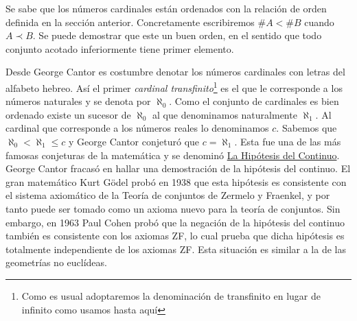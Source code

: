  Se sabe que los números cardinales están ordenados con la relación  de orden  definida en la sección anterior.  Concretamente escribiremos   $\#A< \#B$ cuando $A\prec B$. Se puede demostrar que este un buen orden, en el sentido que todo conjunto acotado inferiormente tiene primer elemento. 
 
 Desde George Cantor es costumbre denotar los números cardinales con letras del alfabeto hebreo. Así el primer \emph{cardinal transfinito}\footnote{Como es usual adoptaremos la denominación de transfinito en lugar de infinito como usamos hasta aquí} es el que le corresponde a los números naturales y se denota por $\aleph_0$.
  Como el conjunto de cardinales es bien ordenado existe un sucesor de $\aleph_0$ al que denominamos naturalmente $\aleph_1$. Al cardinal que corresponde a los números reales lo denominamos $c$. Sabemos que $\aleph_0<\aleph_1\leq c$ y George Cantor  conjeturó
que $c=\aleph_1$. Esta fue una de las más famosas conjeturas de la matemática y se denominó \href{https://es.wikipedia.org/wiki/Hipótesis_del_continuo}{La Hipótesis del Continuo}. George Cantor fracasó en hallar una demostración de la hipótesis del continuo.   El gran matemático Kurt G\"odel probó en 1938 que esta hipótesis es consistente con el sistema axiomático de la Teoría de conjuntos de   Zermelo y Fraenkel, y por tanto puede ser tomado como un axioma nuevo para la teoría de conjuntos. Sin embargo, en 1963  Paul Cohen probó que la negación de la hipótesis del continuo también es consistente con los axiomas ZF, lo cual prueba que dicha hipótesis es totalmente independiente de los axiomas ZF. Esta situación es similar a la de las geometrías no euclídeas. 
